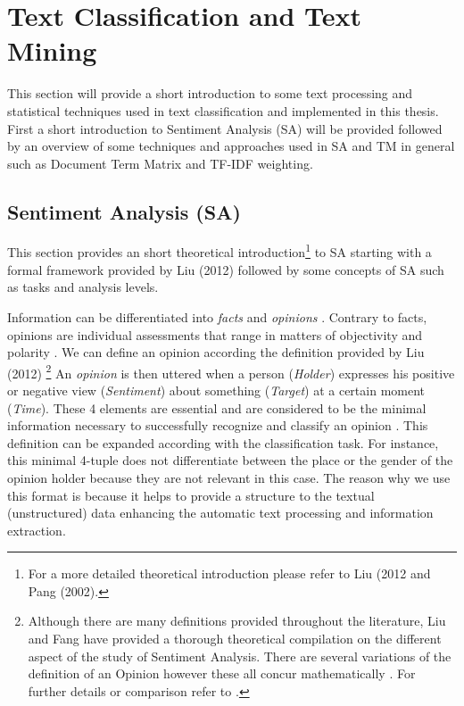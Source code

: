 \documentclass[
	a4paper,
	pdftex,
	12pt,	
	footinclude=true,
	fleqn,
	final,
	]{report}%
\begin{document}
\vspace{-0.55cm}
\section{Text Classification and Text Mining}
\label{sec:sa_theory}
\vspace{-0.3cm}

This section will provide a short introduction to some
text processing and statistical techniques used in 
text classification and implemented in this thesis.
First a short introduction to Sentiment Analysis (SA) will be
provided followed by an overview of some techniques 
and approaches used in SA and TM in general such 
as Document Term Matrix and TF-IDF weighting. 

\vspace{-0.45cm}
\subsection{Sentiment Analysis (SA)}
\label{sec:sa_research}
\vspace{-0.3cm}
This section provides an short theoretical introduction\footnote{
For a more detailed theoretical introduction please refer to Liu (2012 and Pang (2002).} 
to SA starting with a formal framework provided by Liu (2012) \cite{Liu2012a}
followed by some concepts of SA such as tasks and analysis levels. 

Information can be differentiated into \emph{facts} and \emph{opinions} \cite{Liu2010}. Contrary 
to facts, opinions are individual assessments that range in matters of objectivity 
and polarity \cite{Liu2012a}. We can define an opinion according the 
definition provided by Liu (2012) \cite{Liu2012,Liu2012a,Liu2004}\footnote{
Although there are many definitions provided throughout the literature, Liu and Fang have provided
a thorough theoretical compilation on the different aspect of the study of Sentiment Analysis.
There are several variations of the definition of an Opinion however these all concur mathematically \cite{Liu2010}.
For further details or comparison refer to \cite{Liu2012a,Liu2012}.}
An \emph{opinion} is then uttered when a person (\emph{Holder}) expresses his positive or negative view (\emph{Sentiment}) 
about something (\emph{Target}) at a certain moment (\emph{Time}). These 4 elements are essential and are considered to 
be the minimal information necessary to successfully recognize and classify an opinion \cite{Liu2012a}.
This definition can be expanded according with the classification task. For instance, this minimal 4-tuple 
does not differentiate between the place or the gender of the opinion holder because they are not relevant 
in this case. %
The reason why we use this format is because it helps to provide a structure 
to the textual (unstructured) data enhancing the automatic text processing and information extraction. 
\end{document}
